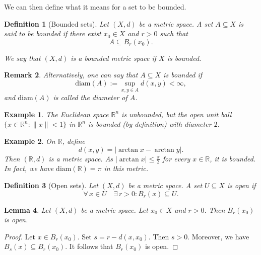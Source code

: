 \documentclass[a4paper,reqno]{amsart}
\numberwithin{equation}{section}
\newtheorem{definition}{Definition}[section]
\newtheorem{lemma}[definition]{Lemma}
\newtheorem{remark}[definition]{Remark}
\newtheorem{example}{Example}
\def\R{\mathbb{R}}
\begin{document}
We can then define what it means for a set to be bounded.



\begin{definition}[Bounded sets]
Let $(X,d)$ be a metric space. A set $A\subseteq X$ is said to be \emph{bounded} if there exist $x_0\in X$ and $r>0$ such that
$$
A\subseteq B_r(x_0).
$$

We say that $(X,d)$ is a \emph{bounded metric space} if $X$ is bounded.
\end{definition}


\begin{remark}
Alternatively, one can say that $A\subseteq X$ is bounded if
\[
\textrm{diam} (A) := \sup_{x ,y \in A} d(x,y) <\infty,
\]
and $\textrm{diam} (A)$ is called the diameter of $A$.

\end{remark}

\begin{example}
The Euclidean space $\R^n$ is unbounded, but the open unit ball
$\{x \in \R^n: \|x\| < 1\}$
in $\R^n$ is bounded (by definition) with diameter $2$.
\end{example}

\begin{example}
On $\R$, define
\[
d(x,y) = |\arctan x - \arctan y|.
\]
Then $(\R,d)$ is a metric space. As $|\arctan x| \le \frac{\pi}{2}$ for every
$x \in \R$, it is bounded. In fact, we have $\textrm{diam} (\R) = \pi$ in this metric.
\end{example}




\begin{definition}[Open sets]
Let $(X,d)$ be a metric space. A set $U \subseteq X$ is \emph{open} if
\[
\forall \, x \in U \quad \exists \, r > 0 : B_r(x) \subseteq U.
\]
\end{definition}

\begin{lemma} \label{lemma:balls}
Let $(X,d)$ be a metric space. Let $x_0 \in X$ and $r > 0$. Then $B_r(x_0)$ is open.
\end{lemma}

\begin{proof}
Let $x \in B_r(x_0)$. Set $s = r - d(x,x_0)$. Then $s > 0$. Moreover, we have $B_s(x) \subseteq B_r(x_0)$. It follows that $B_r(x_0)$ is open.
\end{proof}
\end{document}
